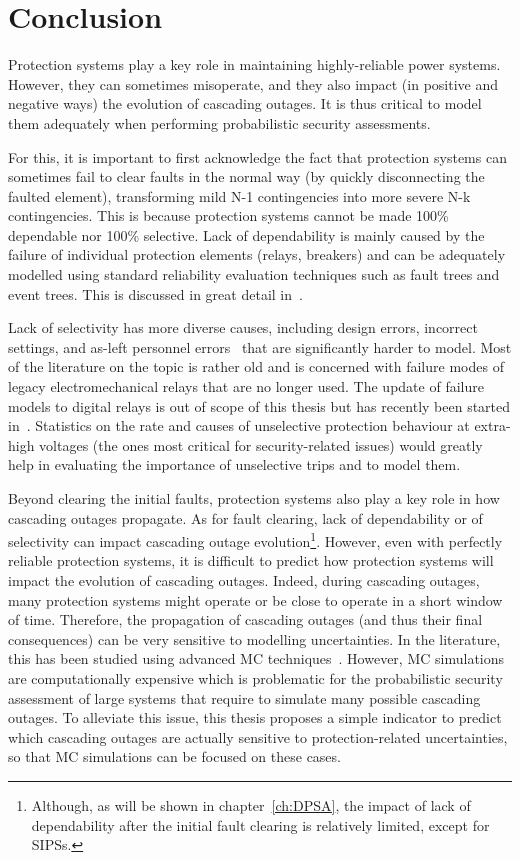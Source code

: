 \section{Conclusion}
\label{sec:protection_conclusion}

Protection systems play a key role in maintaining highly-reliable power systems. However, they can sometimes misoperate, and they also impact (in positive and negative ways) the evolution of cascading outages. It is thus critical to model them adequately when performing probabilistic security assessments.

For this, it is important to first acknowledge the fact that protection systems can sometimes fail to clear faults in the normal way (\ie by quickly disconnecting the faulted element), transforming mild N-1 contingencies into more severe N-k contingencies. This is because protection systems cannot be made 100\% dependable nor 100\% selective. Lack of dependability is mainly caused by the failure of individual protection elements (relays, breakers) and can be adequately modelled using standard reliability evaluation techniques such as fault trees and event trees. This is discussed in great detail in~\cite{GridPSA, Haarla}.

Lack of selectivity has more diverse causes, including design errors, incorrect settings, and as-left personnel errors~\cite{ProtectionMisoperationsBian2012} that are significantly harder to model. Most of the literature on the topic is rather old and is concerned with failure modes of legacy electromechanical relays that are no longer used. The update of failure models to digital relays is out of scope of this thesis but has recently been started in~\cite{Alexandre_PMAPS}. Statistics on the rate and causes of unselective protection behaviour at extra-high voltages (the ones most critical for security-related issues) would greatly help in evaluating the importance of unselective trips and to model them.

Beyond clearing the initial faults, protection systems also play a key role in how cascading outages propagate. As for fault clearing, lack of dependability or of selectivity can impact cascading outage evolution\footnote{Although, as will be shown in chapter~\ref{ch:DPSA}, the impact of lack of dependability after the initial fault clearing is relatively limited, except for SIPSs.}. However, even with perfectly reliable protection systems, it is difficult to predict how protection systems will impact the evolution of cascading outages. Indeed, during cascading outages, many protection systems might operate or be close to operate in a short window of time. Therefore, the propagation of cascading outages (and thus their final consequences) can be very sensitive to modelling uncertainties. In the literature, this has been studied using advanced MC techniques~\cite{SequencesRelaySobol, TwoLevelPSA}. However, MC simulations are computationally expensive which is problematic for the probabilistic security assessment of large systems that require to simulate many possible cascading outages. To alleviate this issue, this thesis proposes a simple indicator to predict which cascading outages are actually sensitive to protection-related uncertainties, so that MC simulations can be focused on these cases.

